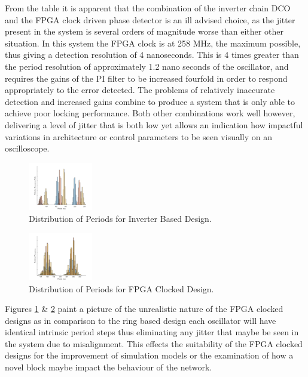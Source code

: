 \documentclass[conference]{IEEEtran}
\begin{document}
From the table it is apparent that the combination of the inverter chain DCO and the FPGA clock driven phase detector is an ill advised choice, as the jitter present in the system is several orders of magnitude worse than either other situation. In this system the FPGA clock is at 258 MHz, the maximum possible, thus giving a detection resolution of 4 nanoseconds. This is 4 times greater than the period resolution of approximately 1.2 nano seconds of the oscillator, and requires the gains of the PI filter to be increased fourfold in order to respond appropriately to the error detected. The problems of relatively inaccurate detection and increased gains combine to produce a system that is only able to achieve poor locking performance.
Both other combinations work well however, delivering a level of jitter that is both low yet allows an indication how impactful variations in architecture or control parameters to be seen visually on an oscilloscope.\\
\begin{figure}[h]
	\centering
	\includegraphics[width=0.25\textwidth]{distrib_ring}
	\caption{Distribution of Periods for Inverter Based Design.}
	\label{fig:dist1}
\end{figure}
\begin{figure}[h]
	\centering
	\includegraphics[width=0.25\textwidth]{distrib_pa}
	\caption{Distribution of Periods for FPGA Clocked Design.}
	\label{fig:dist2}
\end{figure}
Figures \ref{fig:dist1} \& \ref{fig:dist2} paint a picture of the unrealistic nature of the FPGA clocked designs as in comparison to the ring based design each oscillator will have identical intrinsic period steps thus eliminating any jitter that maybe be seen in the system due to misalignment. This effects the suitability of the FPGA clocked designs for the improvement of simulation models or the examination of how a novel block maybe impact the behaviour of the network.
\end{document}
